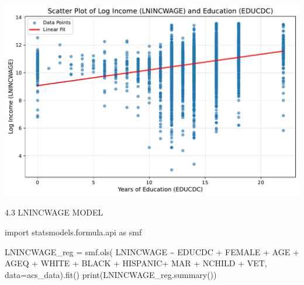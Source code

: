 \documentclass[
  11pt,
  letterpaper,
  DIV=11,
  numbers=noendperiod]{scrartcl}
\newenvironment{Shaded}{\begin{snugshade}}{\end{snugshade}}
\newcommand{\BuiltInTok}[1]{\textcolor[rgb]{0.00,0.23,0.31}{#1}}
\newcommand{\ImportTok}[1]{\textcolor[rgb]{0.00,0.46,0.62}{#1}}
\newcommand{\NormalTok}[1]{\textcolor[rgb]{0.00,0.23,0.31}{#1}}
\newcommand{\OperatorTok}[1]{\textcolor[rgb]{0.37,0.37,0.37}{#1}}
\newcommand{\StringTok}[1]{\textcolor[rgb]{0.13,0.47,0.30}{#1}}
\begin{document}
\includegraphics{mp1_files/figure-pdf/cell-19-output-1.pdf}

4.3 LNINCWAGE MODEL

\begin{Shaded}
\begin{Highlighting}[]
\ImportTok{import}\NormalTok{ statsmodels.formula.api }\ImportTok{as}\NormalTok{ smf}

\NormalTok{LNINCWAGE\_reg }\OperatorTok{=}\NormalTok{ smf.ols(}
    \StringTok{\textquotesingle{}LNINCWAGE \textasciitilde{} EDUCDC + FEMALE + AGE + AGEQ + WHITE + BLACK + HISPANIC+ MAR + NCHILD + VET\textquotesingle{}}\NormalTok{, data}\OperatorTok{=}\NormalTok{acs\_data).fit()}
\BuiltInTok{print}\NormalTok{(LNINCWAGE\_reg.summary())}
\end{Highlighting}
\end{Shaded}
\end{document}
